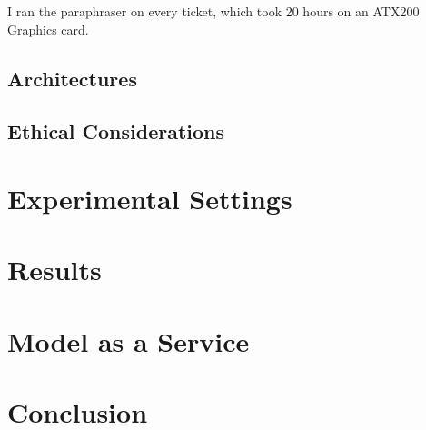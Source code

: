 \documentclass{UoYCSproject}
\begin{document}

I ran the paraphraser on every ticket, which took 20 hours on an ATX200 Graphics card.


\section{Architectures}\label{sec:architectures}

\section{Ethical Considerations}\label{sec:ethical-considerations}

\chapter{Experimental Settings}
\label{ch:experimental-settings}

\chapter{Results}
\label{ch:results}

\chapter{Model as a Service}
\label{ch:model-as-a-service}

\chapter{Conclusion}
\label{ch:conclusion}

\printbibliography
\end{document}
